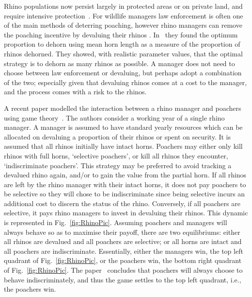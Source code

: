 \documentclass[10pt]{article}
\begin{document}
Rhino populations now persist largely in protected areas or on private land, and
require intensive protection~\cite{Ferreira2014}. For wildlife managers law 
enforcement is often one of the main methods of deterring poaching, however 
rhino managers can remove the poaching incentive by devaluing their rhinos 
\cite{Milner1992}. In~\cite{Milner1992} they found the 
optimum proportion to dehorn using mean horn length as a measure of the 
proportion of rhinos dehorned. They showed, with realistic parameter values, 
that the optimal strategy is to dehorn as many rhinos as possible. 
A manager does not need to choose between law enforcement or devaluing, but
perhaps adopt a combination of the two; especially given that devaluing rhinos 
comes at a cost to the manager, and the process comes with a risk to the rhinos.

A recent paper modelled the interaction between a rhino manager and poachers
using game theory~\cite{Lee}.  The authors consider a working year of a single 
rhino manager.  A manager is assumed to have standard yearly resources which
can be allocated on devaluing a proportion of their rhinos or spent on security. 
It is assumed that all rhinos initially have intact horns. Poachers may either only
kill rhinos with full horns, `selective poachers', or kill all rhinos they encounter, 
`indiscriminate poachers'. This strategy may be preferred to avoid tracking a 
devalued rhino again, and/or to gain the value from the partial horn. If all rhinos 
are left by the rhino manager with their intact horns, it does not pay poachers to 
be selective so they will chose to be indiscriminate since being selective incurs 
an additional cost to discern the status of the rhino. Conversely, if all poachers are
selective, it pays rhino managers to invest in devaluing their rhinos. This dynamic
is represented in Fig.~\ref{fig:RhinoPic}. Assuming poachers and managers will 
always behave so as to maximise their payoff, there are two equilibriums: either 
all rhinos are devalued and all poachers are selective;
or all horns are intact and all poachers are indiscriminate. Essentially, either the managers 
win, the top left quadrant of Fig.~\ref{fig:RhinoPic}, or the poachers win, the bottom
right quadrant of Fig.~\ref{fig:RhinoPic}. The paper~\cite{Lee} concludes that poachers will
always choose to behave indiscriminately, and thus the game settles to the top
left quadrant, i.e., the poachers win.
\end{document}
